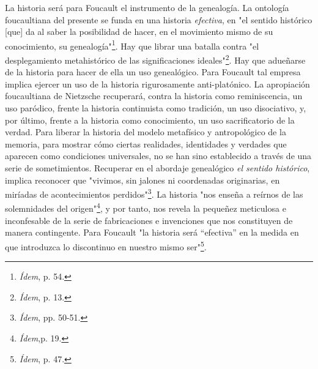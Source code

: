 \documentclass{book}
\begin{document}
La historia será para Foucault el instrumento de la genealogía. La
ontología foucaultiana del presente se funda en una historia
\emph{efectiva}, en "el sentido histórico {[}que{]} da al saber la
posibilidad de hacer, en el movimiento mismo de su conocimiento, su
genealogía"\footnote{\emph{Ídem}, p. 54.}. Hay que librar una batalla
contra "el desplegamiento metahistórico de las significaciones
ideales"\footnote{\emph{Ídem}, p. 13.}. Hay que adueñarse de la historia
para hacer de ella un uso genealógico. Para Foucault tal empresa implica
ejercer un uso de la historia rigurosamente anti-platónico. La
apropiación foucaultiana de Nietzsche recuperará, contra la historia
como reminiscencia, un uso paródico, frente la historia continuista como
tradición, un uso disociativo, y, por último, frente a la historia como
conocimiento, un uso sacrificatorio de la verdad. Para liberar la
historia del modelo metafísico y antropológico de la memoria, para
mostrar cómo ciertas realidades, identidades y verdades que aparecen
como condiciones universales, no se han sino establecido a través de una
serie de sometimientos. Recuperar en el abordaje genealógico \emph{el
sentido histórico}, implica reconocer que "vivimos, sin jalones ni
coordenadas originarias, en miríadas de acontecimientos
perdidos"\footnote{\emph{Ídem}, pp. 50-51.}. La historia "nos enseña a
reírnos de las solemnidades del origen"\footnote{\emph{Ídem},p. 19.}, y
por tanto, nos revela la pequeñez meticulosa e inconfesable de la serie
de fabricaciones e invenciones que nos constituyen de manera
contingente. Para Foucault "la historia será ``efectiva'' en la medida
en que introduzca lo discontinuo en nuestro mismo ser"\footnote{\emph{Ídem},
  p. 47.}.
\end{document}
